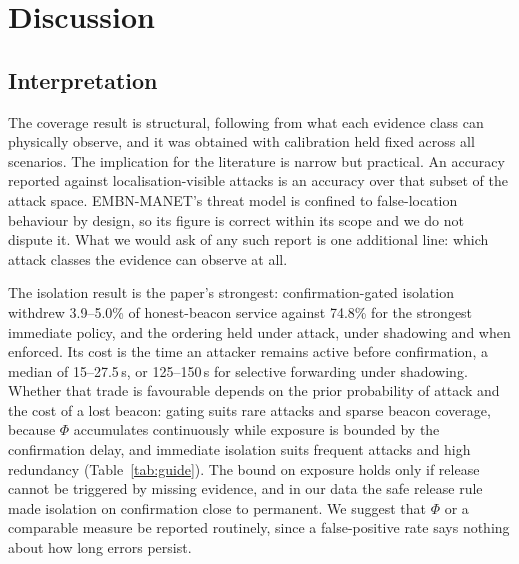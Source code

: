 \section{Discussion}
\label{sec:discussion}

\subsection{Interpretation}

The coverage result is structural, following from what each evidence class can
physically observe, and it was obtained
with calibration held fixed across all scenarios. The implication for the
literature is narrow but practical. An accuracy reported against
localisation-visible attacks is an accuracy over that subset of the attack
space. EMBN-MANET's threat model is confined to false-location behaviour by
design, so its figure is correct within its scope and we do not dispute it.
What we would ask of any such report is one additional line: which attack
classes the evidence can observe at all.

The isolation result is the paper's strongest: confirmation-gated isolation
withdrew 3.9--5.0\% of honest-beacon service against 74.8\% for the strongest
immediate policy, and the ordering held under attack, under shadowing and when
enforced. Its cost is the time an attacker remains active before
confirmation, a median of 15--27.5\,s, or 125--150\,s for selective forwarding
under shadowing. Whether that trade is favourable depends on the prior
probability of attack and the cost of a lost beacon: gating suits rare attacks
and sparse beacon coverage, because $\Phi$ accumulates continuously while
exposure is bounded by the confirmation delay, and immediate isolation suits
frequent attacks and high redundancy (Table~\ref{tab:guide}). The bound on
exposure holds only if release cannot be triggered by missing evidence, and in
our data the safe release rule made isolation on confirmation close to
permanent. We suggest that $\Phi$ or a comparable measure be reported
routinely, since a false-positive rate says nothing about how long errors
persist.

